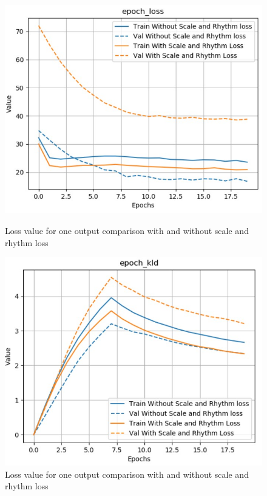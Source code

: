 \documentclass[12pt]{report}
\begin{document}
\begin{figure}[htbp]
    \begin{minipage}{0.5\textwidth}
        \begin{center}
            \includegraphics[width=\textwidth]{images/experiences/scale-rhythm-rnn/loss-comparison-scale-rhythm.jpg}
            \caption{Loss value for one output comparison with and without scale and rhythm loss}
            \label{fig:exp:scale-rhythm:loss-comparison}
        \end{center}
    \end{minipage} \hfill
    \begin{minipage}{0.5 \textwidth}
        \begin{center}
            \includegraphics[width=\textwidth]{images/experiences/scale-rhythm-rnn/kld-comparison-scale-rhythm.jpg}
            \caption{Loss value for one output comparison with and without scale and rhythm loss}
            \label{fig:exp:scale-rhythm:kld-comparison}
        \end{center}
    \end{minipage}
\end{figure}
\end{document}
